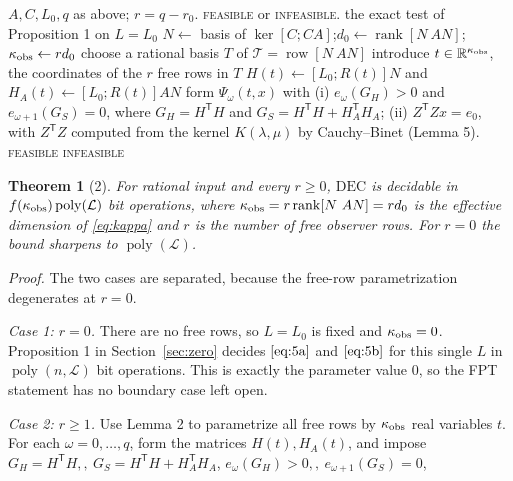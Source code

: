 \documentclass[journal]{IEEEtran}
\theoremstyle{plainn}
\newtheorem*{thm}{Theorem}
\theoremstyle{remark}
\begin{document}
\begin{algorithm}[!t]
\caption{Deciding $\mathrm{DEC}(q)$ in time $f(\kappa_{\rm obs})\operatorname{poly}(\mathcal L)$}
\label{alg:fpt}
\begin{algorithmic}[1]
\Require $A,C,L_0,q$ as above; $r=q-r_0$.
\Ensure \textsc{feasible} or \textsc{infeasible}.
  \State \Return the exact test of Proposition 1 on $L=L_0$
\EndIf
\State $N\gets$ basis of $\ker[C;CA]$;\quad $d_0\gets\operatorname{rank}[N\ AN]$;\quad
$\kappa_{\rm obs}\gets rd_0$
\State choose a rational basis $T$ of $\mathcal T=\operatorname{row}[N\ AN]$
\State introduce $t\in\mathbb R^{\kappa_{\rm obs}}$, the coordinates of the $r$ free rows in $T$
\State $H(t)\gets[L_0;R(t)]N$ and $H_A(t)\gets[L_0;R(t)]AN$
  \State form $\Psi_\omega(t,x)$ with
  \Statex \quad (i) $e_\omega(G_H)>0$ and $e_{\omega+1}(G_S)=0$, where
           $G_H=H^{\mathsf T}H$ and $G_S=H^{\mathsf T}H+H_A^{\mathsf T}H_A$;
  \Statex \quad (ii) $Z^{\mathsf T}Zx=e_0$, with $Z^{\mathsf T}Z$ computed from the kernel
           $K(\lambda,\mu)$ by Cauchy--Binet (Lemma 5).
    \State \Return \textsc{feasible}
  \EndIf
\EndFor
\State \Return \textsc{infeasible}
\end{algorithmic}
\end{algorithm}

\begin{thm}[2] For rational input and every $r\ge0$, $\mathrm{DEC}$ is decidable in
$f(\kappa_{\rm obs})\operatorname{poly}(\mathcal L)$ bit operations, where
$\kappa_{\rm obs}=r\operatorname{rank}[N\ AN]=r d_0$ is the effective dimension of \eqref{eq:kappa} and $r$ is the number of free observer rows. For $r=0$ the bound sharpens to $\operatorname{poly}(\mathcal L)$.

\end{thm}
\emph{Proof.} The two cases are separated, because the free-row parametrization degenerates at $r=0$.

\emph{Case 1: $r=0$.} There are no free rows, so $L=L_0$ is fixed and $\kappa_{\rm obs}=0$. Proposition 1 in Section~\ref{sec:zero} decides $\eqref{eq:5a}$ and $\eqref{eq:5b}$ for this single $L$ in $\operatorname{poly}(n,\mathcal L)$ bit operations. This is exactly the parameter value $0$, so the FPT statement has no boundary case left open.

\emph{Case 2: $r\ge1$.} Use Lemma 2 to parametrize all free rows by $\kappa_{\rm obs}$ real variables $t$. For each $\omega=0,\dots,q$, form the matrices $H(t),H_A(t)$, and impose $G_H=H^{\mathsf T}H,,\  G_S=H^{\mathsf T}H+H_A^{\mathsf T}H_A$, $e_\omega(G_H)>0,,\  e_{\omega+1}(G_S)=0$,
\end{document}
